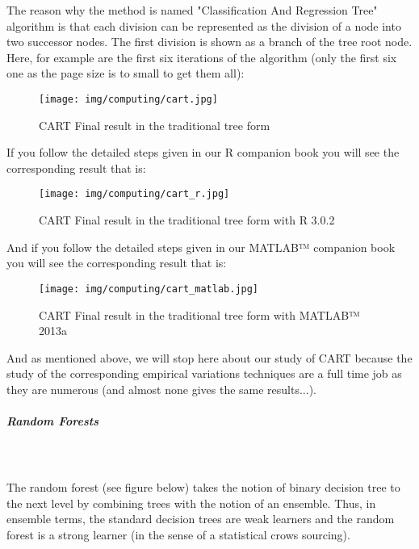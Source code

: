 	The reason why the method is named "Classification And Regression Tree" algorithm is that each division can be represented as the division of a node into two successor nodes. The first division is shown as a branch of the tree root node. Here, for example are the first six iterations of the algorithm (only the first six one as the page size is to small to get them all):
	\begin{figure}[H]
		\centering
		\texttt{[image: img/computing/cart.jpg]}
		\caption{CART Final result in the traditional tree form}
	\end{figure}
	If you follow the detailed steps given in our R companion book you will see the corresponding result that is:
	\begin{figure}[H]
		\centering
		\texttt{[image: img/computing/cart\_r.jpg]}
		\caption[]{CART Final result in the traditional tree form with R 3.0.2}
	\end{figure}
	And if you follow the detailed steps given in our MATLAB™ companion book you will see the corresponding result that is:
	\begin{figure}[H]
		\centering
		\texttt{[image: img/computing/cart\_matlab.jpg]}
		\caption[]{CART Final result in the traditional tree form with MATLAB™ 2013a}
	\end{figure}
	And as mentioned above, we will stop here about our study of CART because the study of the corresponding empirical variations techniques are a full time job as they are numerous (and almost none gives the same results...).
	
	\subparagraph{Random Forests}\mbox{}\\\\
	The random forest (see figure below) takes the notion of binary decision tree to the next level by combining trees with the notion of an ensemble. Thus, in ensemble terms, the standard decision trees are weak learners and the random forest is a strong learner (in the sense of a statistical crows sourcing).
	
